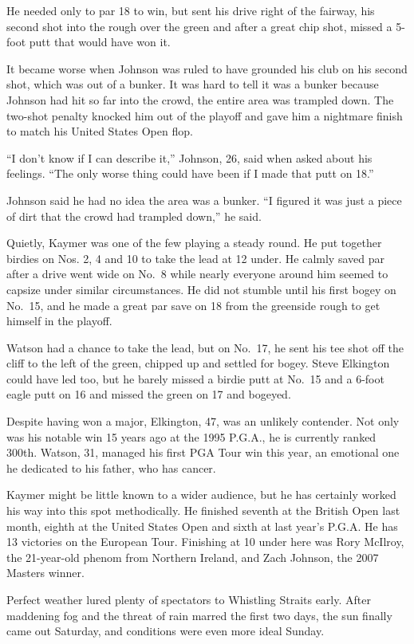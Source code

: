 ﻿\documentclass[12pt]{article}
\begin{document}
He needed only to par 18 to win, but sent his drive right of the fairway, his second shot into the
rough over the green and after a great chip shot, missed a 5-foot putt that would have won it.

It became worse when Johnson was ruled to have grounded his club on his second shot, which was out
of a bunker. It was hard to tell it was a bunker because Johnson had hit so far into the crowd, the
entire area was trampled down. The two-shot penalty knocked him out of the playoff and gave him a
nightmare finish to match his United States Open flop.

``I don't know if I can describe it,'' Johnson, 26, said when asked about his feelings. ``The only
worse thing could have been if I made that putt on 18.''

Johnson said he had no idea the area was a bunker. ``I figured it was just a piece of dirt that the
crowd had trampled down,'' he said.

Quietly, Kaymer was one of the few playing a steady round. He put together birdies on Nos. 2, 4 and
10 to take the lead at 12 under. He calmly saved par after a drive went wide on No.~8 while nearly
everyone around him seemed to capsize under similar circumstances. He did not stumble until his
first bogey on No.~15, and he made a great par save on 18 from the greenside rough to get himself in
the playoff.

Watson had a chance to take the lead, but on No.~17, he sent his tee shot off the cliff to the left
of the green, chipped up and settled for bogey. Steve Elkington could have led too, but he barely
missed a birdie putt at No.~15 and a 6-foot eagle putt on 16 and missed the green on 17 and bogeyed.

Despite having won a major, Elkington, 47, was an unlikely contender. Not only was his notable win
15 years ago at the 1995 P.G.A., he is currently ranked 300th. Watson, 31, managed his first PGA
Tour win this year, an emotional one he dedicated to his father, who has cancer.

Kaymer might be little known to a wider audience, but he has certainly worked his way into this spot
methodically. He finished seventh at the British Open last month, eighth at the United States Open
and sixth at last year's P.G.A. He has 13 victories on the European Tour. Finishing at 10 under here
was Rory McIlroy, the 21-year-old phenom from Northern Ireland, and Zach Johnson, the 2007 Masters
winner.

Perfect weather lured plenty of spectators to Whistling Straits early. After maddening fog and the
threat of rain marred the first two days, the sun finally came out Saturday, and conditions were
even more ideal Sunday.
\end{document}
